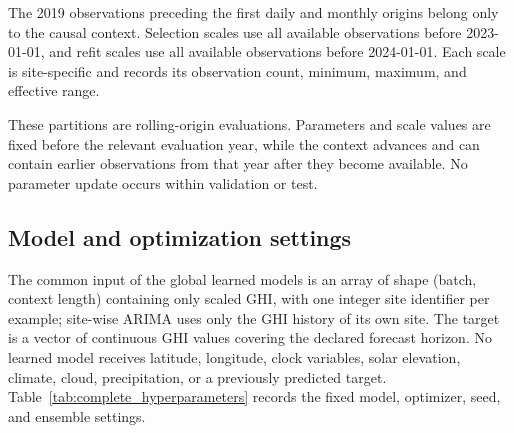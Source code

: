The 2019 observations preceding the first daily and monthly origins belong only
to the causal context. Selection scales use all available observations before
2023-01-01, and refit scales use all available observations before 2024-01-01.
Each scale is site-specific and records its observation count, minimum, maximum,
and effective range.

These partitions are rolling-origin evaluations. Parameters and scale values
are fixed before the relevant evaluation year, while the context advances and
can contain earlier observations from that year after they become available.
No parameter update occurs within validation or test.

\subsection{Model and optimization settings}

The common input of the global learned models is an array of shape
(batch, context length) containing only scaled GHI, with one integer site
identifier per example; site-wise ARIMA uses only the GHI history of its
own site. The target is a vector of continuous GHI values
covering the declared forecast horizon. No learned model receives latitude, longitude, clock variables,
solar elevation, climate, cloud, precipitation, or a previously predicted
target. Table~\ref{tab:complete_hyperparameters} records the fixed model,
optimizer, seed, and ensemble settings.

